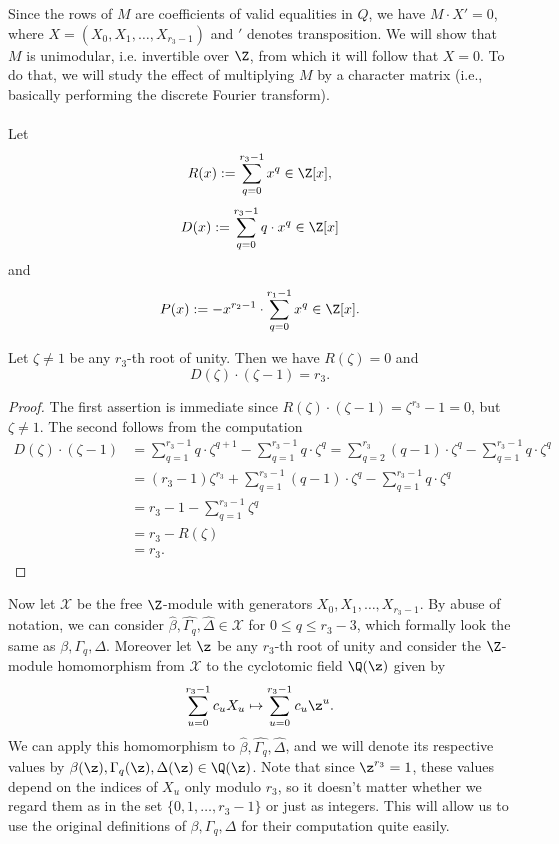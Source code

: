 Since the rows of $M$ are coefficients of valid equalities in $Q$, we have $M\cdot X'=0$, where $X=(X_0,X_1,\dots,X_{r_3-1})$ and $'$ denotes transposition. We will show that $M$ is unimodular, i.e. invertible over $\Z$, from which it will follow that $X=0$. To do that, we will study the effect of multiplying $M$ by a character matrix (i.e., basically performing the discrete Fourier transform).

\paragraph*{}
Let $$R(x):=\sum_{q=0}^{r_3-1} x^q\in\Z[x],$$
$$D(x):=\sum_{q=0}^{r_3-1}q\cdot x^q\in \Z[x]$$
and 
$$P(x):=-x^{r_2-1}\cdot \sum_{q=0}^{r_1-1} x^q\in \Z[x].$$

\begin{lemma}\label{RD}
Let $\zeta\neq 1$ be any $r_3$-th root of unity. Then we have $R(\zeta)=0$ and $$D(\zeta)\cdot(\zeta-1)=r_3.$$
\end{lemma}
\begin{proof}
The first assertion is immediate since $R(\zeta)\cdot(\zeta-1)=\zeta^{r_3}-1=0$, but $\zeta\neq 1$. The second follows from the computation
\begin{equation*}
\begin{split}
D(\zeta)\cdot(\zeta-1)&=\sum_{q=1}^{r_3-1} q\cdot \zeta^{q+1}-\sum_{q=1}^{r_3-1} q\cdot \zeta^q=\sum_{q=2}^{r_3} (q-1)\cdot \zeta^{q}-\sum_{q=1}^{r_3-1} q\cdot \zeta^q\\
&=(r_3-1)\zeta^{r_3}+\sum_{q=1}^{r_3-1} (q-1)\cdot \zeta^{q}-\sum_{q=1}^{r_3-1} q\cdot \zeta^q\\
&=r_3-1-\sum_{q=1}^{r_3-1} \zeta^{q}\\
&=r_3- R(\zeta)\\
&=r_3.
\end{split}
\end{equation*}
\end{proof}

Now let $\mathcal{X}$ be the free $\Z$-module with generators $X_0,X_1,\dots,X_{r_3-1}$. By abuse of notation, we can consider $\widehat{\beta},\widehat{\Gamma_q},\widehat{\Delta}\in \mathcal{X}$ for $0\leq q\leq r_3-3$, which formally look the same as $\beta,\Gamma_q,\Delta$. Moreover let $\z$ be any $r_3$-th root of unity and consider the $\Z$-module homomorphism from $\mathcal{X}$ to the cyclotomic field $\Q(\z)$ given by $$\sum_{u=0}^{r_3-1}c_u X_u\mapsto \sum_{u=0}^{r_3-1}c_u \z^u.$$ 
We can apply this homomorphism to $\widehat{\beta},\widehat{\Gamma_q},\widehat{\Delta}$, and we will denote its respective values by $\beta(\z),\Gamma_q(\z),\Delta(\z)\in\Q(\z)$. Note that since $\z^{r_3}=1$, these values depend on the indices of $X_u$ only modulo $r_3$, so it doesn't matter whether we regard them as in the set $\{0,1,\dots,r_3-1\}$ or just as integers. This will allow us to use the original definitions of $\beta,\Gamma_q,\Delta$ for their computation quite easily.

